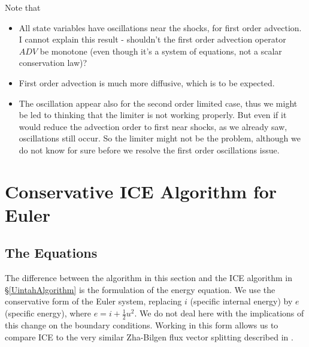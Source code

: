 \documentclass[11pt,oneside]{article}
\begin{document}
Note that
\begin{itemize}
\item All state variables have oscillations near the shocks, for first
order advection. I cannot explain this result - shouldn't the
first order advection operator $ADV$ be monotone (even though it's a system
of equations, not a scalar conservation law)?
\item First order advection is much more diffusive, which is to be expected.
\item The oscillation appear also for the second order limited case,
thus we might be led to thinking that the limiter is not working properly.
But even if it would reduce the advection order to first near shocks, as
we already saw, oscillations still occur. So the limiter might not be
the problem, although we do not know for sure before we resolve the
first order oscillations issue.
\end{itemize}


\newpage
\section{Conservative ICE Algorithm for Euler}
\label{ConservativeICE}

\subsection{The Equations}
\label{ConservativeEulerEq}
The difference between the algorithm in this section and the ICE algorithm
in \S \ref{UintahAlgorithm} is the formulation of the energy equation. We use
the conservative form of the Euler system, replacing $i$ (specific internal
energy) by $e$ (specific energy), where $e = i + \frac12 u^2$. We do not
deal here with the implications of this change on the boundary conditions.
Working in this form allows us to compare ICE to the very similar Zha-Bilgen
flux vector splitting described in \cite{zb}.
\end{document}

